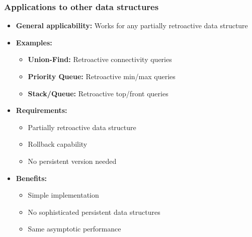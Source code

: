 \documentclass[fleqn]{beamer}
\begin{document}
\begin{frame}
    \frametitle{Applications to other data structures}
    
    \begin{itemize}
    \item \textbf{General applicability:} Works for any partially retroactive data structure \vfill\pause
    \item \textbf{Examples:}
        \begin{itemize}
        \item \textbf{Union-Find:} Retroactive connectivity queries \vfill
        \item \textbf{Priority Queue:} Retroactive min/max queries \vfill
        \item \textbf{Stack/Queue:} Retroactive top/front queries \vfill
        \end{itemize} \vfill\pause
    \item \textbf{Requirements:}
        \begin{itemize}
        \item Partially retroactive data structure
        \item Rollback capability
        \item No persistent version needed
        \end{itemize} \vfill\pause
    \item \textbf{Benefits:}
        \begin{itemize}
        \item Simple implementation
        \item No sophisticated persistent data structures
        \item Same asymptotic performance
        \end{itemize} \vfill
    \end{itemize}
\end{frame}
\end{document}

